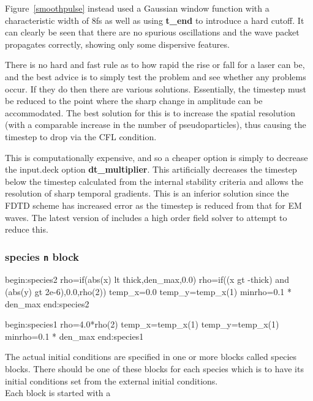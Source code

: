 \documentclass[12pt,a4paper]{article}
\newcommand{\inlinecode}[1]{{\color{warwickred} \bf\texttt{#1}}}
\newcommand{\inlineemph}[1]{{\color{warwicklight} \bf{#1}}}
\newcommand{\EPOCH}{{\color{warwickdark}\fontfamily{phv}\selectfont{EPOCH}}}
\newenvironment{lboxverbatim}[1]{
\setlength{\FrameSep}{0pt}
\def\FrameCommand{\fboxsep=0pt \colorbox{shadecolor}}
\MakeFramed{\FrameRestore}
\vspace{-13.5pt}
\fvset{label=#1}
\boxverb
}{
\endboxverb
\vspace{-13.5pt}
\endMakeFramed
}
\begin{document}
Figure~\ref{smoothpulse} instead used a Gaussian window function with a
characteristic width of 8fs as well as using \inlineemph{t\_end} to introduce
a hard cutoff. It can clearly be seen that there are no spurious oscillations
and the wave packet propagates correctly, showing only some dispersive
features.

There is no hard and fast rule as to how rapid the rise or fall for a laser can
be, and the best advice is to simply test the problem and see whether any
problems occur. If they do then there are various solutions. Essentially, the
timestep must be reduced to the point where the sharp change in amplitude can
be accommodated. The best solution for this is to increase the spatial
resolution (with a comparable increase in the number of pseudoparticles), thus
causing the timestep to drop via the CFL condition.

This is computationally expensive, and so a cheaper option is simply to
decrease the input.deck option \inlineemph{dt\_multiplier}. This artificially
decreases the timestep below the timestep calculated from the internal
stability criteria and allows the resolution of sharp temporal gradients. This
is an inferior solution since the FDTD scheme has increased error as the
timestep is reduced from that for EM waves. The latest version of {\EPOCH}
includes a high order field solver to attempt to reduce this.

\subsubsection{\inlineemph{species\inlinecode{n}} block}

\begin{lboxverbatim}{species{\it n} block}
begin:species2
   rho=if(abs(x) lt thick,den_max,0.0)
   rho=if((x gt -thick) and (abs(y) gt 2e-6),0.0,rho(2))
   temp_x=0.0
   temp_y=temp_x(1)
   minrho=0.1 * den_max
end:species2

begin:species1
   rho=4.0*rho(2)
   temp_x=temp_x(1)
   temp_y=temp_x(1)
   minrho=0.1 * den_max
end:species1
\end{lboxverbatim}

The actual initial conditions are specified in one or more blocks called
species blocks. There should be one of these blocks for each species which is
to have its initial conditions set from the external initial conditions.\\

Each block is started with a\\
\end{document}
